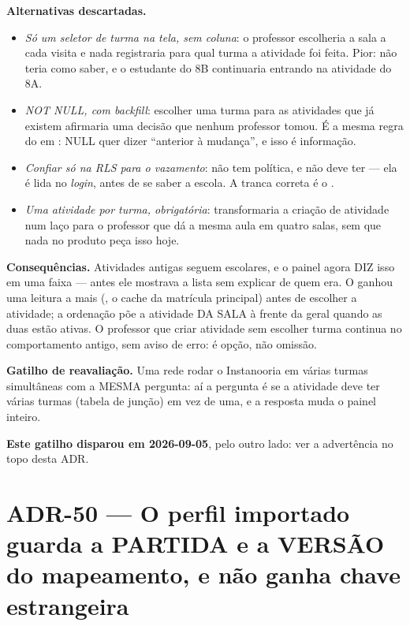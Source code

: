 \textbf{Alternativas descartadas.}
\begin{itemize}
  \item \emph{Só um seletor de turma na tela, sem coluna}: o professor
    escolheria a sala a cada visita e nada registraria para qual turma a
    atividade foi feita. Pior:  não teria como saber, e o estudante do
    8B continuaria entrando na atividade do 8A.
  \item \emph{ NOT NULL, com \emph{backfill}}: escolher uma turma
    para as atividades que já existem afirmaria uma decisão que nenhum professor
    tomou. É a mesma regra do  em
    : NULL quer dizer
    ``anterior à mudança'', e isso é informação.
  \item \emph{Confiar só na RLS para o vazamento}:  não tem política, e
    não deve ter --- ela é lida no \emph{login}, antes de se saber a escola. A
    tranca correta é o .
  \item \emph{Uma atividade por turma, obrigatória}: transformaria a criação de
    atividade num laço para o professor que dá a mesma aula em quatro salas, sem
    que nada no produto peça isso hoje.
\end{itemize}

\textbf{Consequências.} Atividades antigas seguem escolares, e o painel agora
DIZ isso em uma faixa --- antes ele mostrava a lista sem explicar de quem era. O
 ganhou uma leitura a mais (, o cache da
matrícula principal) antes de escolher a atividade; a ordenação põe a atividade
DA SALA à frente da geral quando as duas estão ativas. O professor que criar
atividade sem escolher turma continua no comportamento antigo, sem aviso de
erro: é opção, não omissão.

\textbf{Gatilho de reavaliação.} Uma rede rodar o Instanooria em várias turmas
simultâneas com a MESMA pergunta: aí a pergunta é se a atividade deve ter várias
turmas (tabela de junção) em vez de uma, e a resposta muda o painel inteiro.

\textbf{Este gatilho disparou em 2026-09-05}, pelo outro lado: ver a advertência
no topo desta ADR.

\section{ADR-50 --- O perfil importado guarda a PARTIDA e a VERSÃO do
mapeamento, e não ganha chave estrangeira}
\label{adr:perfil-importado-versao}


